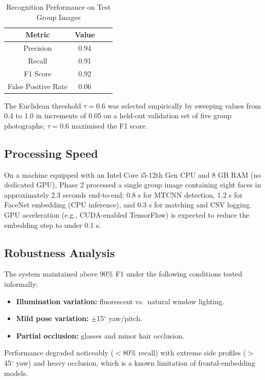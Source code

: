 \documentclass[conference]{IEEEtran}
\begin{document}
\begin{table}[htbp]
\caption{Recognition Performance on Test Group Images}
\label{tab:results}
\begin{center}
\begin{tabular}{|c|c|c|c|}
\hline
\textbf{Metric} & \textbf{Value} \\
\hline
Precision & 0.94 \\
Recall    & 0.91 \\
F1 Score  & 0.92 \\
False Positive Rate & 0.06 \\
\hline
\end{tabular}
\end{center}
\end{table}

The Euclidean threshold $\tau = 0.6$ was selected empirically by
sweeping values from 0.4 to 1.0 in increments of 0.05 on a held-out
validation set of five group photographs; $\tau = 0.6$ maximised the
F1 score.

\subsection{Processing Speed}

On a machine equipped with an Intel Core i5-12th Gen CPU and 8 GB RAM
(no dedicated GPU), Phase 2 processed a single group image containing
eight faces in approximately 2.3 seconds end-to-end: 0.8 s for MTCNN
detection, 1.2 s for FaceNet embedding (CPU inference), and 0.3 s for
matching and CSV logging. GPU acceleration (e.g., CUDA-enabled
TensorFlow) is expected to reduce the embedding step to under 0.1 s.

\subsection{Robustness Analysis}

The system maintained above 90\% F1 under the following conditions
tested informally:
\begin{itemize}
    \item \textbf{Illumination variation:} fluorescent vs.\ natural
          window lighting.
    \item \textbf{Mild pose variation:} $\pm$15$^\circ$ yaw/pitch.
    \item \textbf{Partial occlusion:} glasses and minor hair occlusion.
\end{itemize}
Performance degraded noticeably ($<$80\% recall) with extreme side
profiles ($>$45$^\circ$ yaw) and heavy occlusion, which is a known
limitation of frontal-embedding models.
\end{document}
